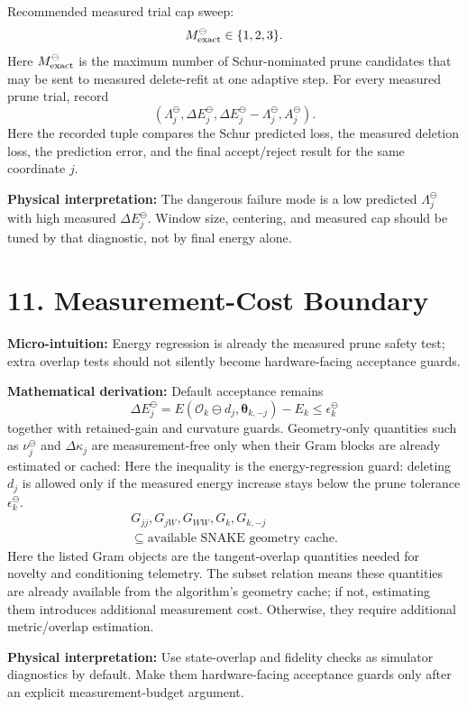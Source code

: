 \documentclass[10pt,twocolumn]{article}
\newcommand{\blk}[1]{\vspace{3pt}\noindent\textbf{#1:}\quad}
\newcommand{\Ek}{E_k}
\newcommand{\Ok}{\mathcal O_k}
\newcommand{\Lam}{\Lambda_j^{\ominus}}
\newcommand{\nudel}{\nu_j^{\ominus}}
\newcommand{\dEdel}{\Delta E_j^{\ominus}}
\begin{document}
Recommended measured trial cap sweep:
\[
M_{\rm exact}^{\ominus}\in\{1,2,3\}.
\]
Here \(M_{\rm exact}^{\ominus}\) is the maximum number of Schur-nominated prune candidates that may be sent to measured delete-refit at one adaptive step.
For every measured prune trial, record
\[
\boxed{
(\Lam,\dEdel,\dEdel-\Lam,A_j^\ominus).
}
\]
Here the recorded tuple compares the Schur predicted loss, the measured deletion loss, the prediction error, and the final accept/reject result for the same coordinate \(j\).

\blk{Physical interpretation}
The dangerous failure mode is a low predicted \(\Lam\) with high measured \(\dEdel\). Window size, centering, and measured cap should be tuned by that diagnostic, not by final energy alone.

\section*{11. Measurement-Cost Boundary}

\blk{Micro-intuition}
Energy regression is already the measured prune safety test; extra overlap tests should not silently become hardware-facing acceptance guards.

\blk{Mathematical derivation}
Default acceptance remains
\[
\dEdel
=
E(\Ok\ominus d_j,\boldsymbol\theta_{k,-j})-\Ek
\le
\epsilon_k^\ominus
\]
together with retained-gain and curvature guards. Geometry-only quantities such as \(\nudel\) and \(\Delta\kappa_j\) are measurement-free only when their Gram blocks are already estimated or cached:
Here the inequality is the energy-regression guard: deleting \(d_j\) is allowed only if the measured energy increase stays below the prune tolerance \(\epsilon_k^\ominus\).
\[
\begin{gathered}
G_{jj},G_{jW},G_{WW},G_k,G_{k,-j}\\
\subseteq
\text{available SNAKE geometry cache}.
\end{gathered}
\]
Here the listed Gram objects are the tangent-overlap quantities needed for novelty and conditioning telemetry. The subset relation means these quantities are already available from the algorithm's geometry cache; if not, estimating them introduces additional measurement cost.
Otherwise, they require additional metric/overlap estimation.

\blk{Physical interpretation}
Use state-overlap and fidelity checks as simulator diagnostics by default. Make them hardware-facing acceptance guards only after an explicit measurement-budget argument.
\end{document}
